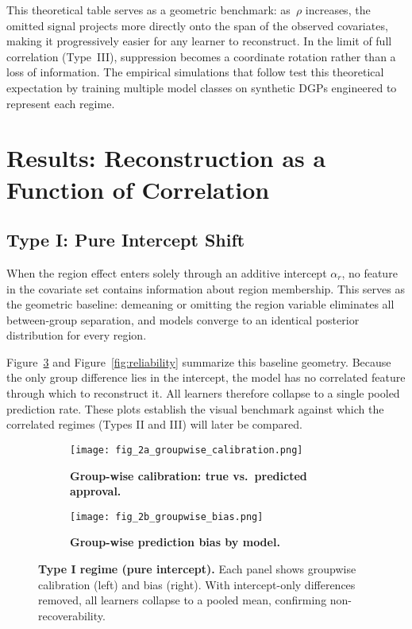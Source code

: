 \documentclass[11pt]{article}
\begin{document}
This theoretical table serves as a geometric benchmark:  
as~$\rho$ increases, the omitted signal projects more directly onto the span of
the observed covariates, making it progressively easier for any learner to
reconstruct.  
In the limit of full correlation (Type~III), suppression becomes a coordinate
rotation rather than a loss of information.  
The empirical simulations that follow test this theoretical expectation by
training multiple model classes on synthetic DGPs engineered to represent each
regime.

\section{Results: Reconstruction as a Function of Correlation}
\label{sec:results}

\subsection{Type I: Pure Intercept Shift}
When the region effect enters solely through an additive intercept $\alpha_r$, no feature in the covariate set contains information about region membership.  
This serves as the geometric baseline: demeaning or omitting the region variable eliminates all between-group separation, and models converge to an identical posterior distribution for every region.

Figure~\ref{fig:typeI} and Figure~\ref{fig:reliability}
summarize this baseline geometry.  
Because the only group difference lies in the intercept, the model has
no correlated feature through which to reconstruct it.
All learners therefore collapse to a single pooled prediction rate.
These plots establish the visual benchmark against which
the correlated regimes (Types II and III) will later be compared.

\begin{figure}[H]
  \centering
  \begin{subfigure}[t]{0.465\textwidth}
    \texttt{[image: fig\_2a\_groupwise\_calibration.png]}
    \caption{\textbf{Group-wise calibration: true vs.\ predicted approval.}} 
    \label{fig:2a_calibration}
  \end{subfigure}
  \hfill
  \begin{subfigure}[t]{0.48\textwidth}
    \texttt{[image: fig\_2b\_groupwise\_bias.png]}
    \caption{\textbf{Group-wise prediction bias by model.}} 
    \label{fig:2b_bias}
  \end{subfigure}

  \caption{\textbf{Type I regime (pure intercept).}
  Each panel shows groupwise calibration (left) and bias (right).  
  With intercept-only differences removed, all learners collapse to a pooled mean, confirming non-recoverability.}
  \label{fig:typeI}
\end{figure}
\end{document}
